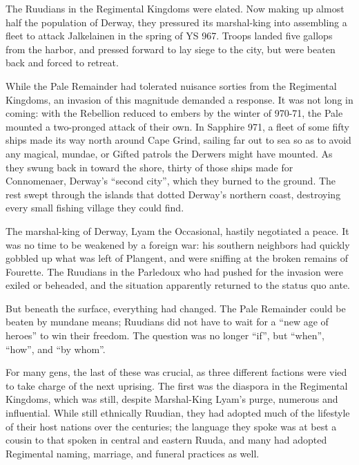 \documentclass[12pt]{report}
\begin{document}
The Ruudians in the Regimental Kingdoms were elated.  Now making up
almost half the population of Derway, they pressured its marshal-king
into assembling a fleet to attack Jalkelainen in the spring of YS 967.
Troops landed five gallops from the harbor, and pressed forward to lay
siege to the city, but were beaten back and forced to retreat.

While the Pale Remainder had tolerated nuisance sorties from the
Regimental Kingdoms, an invasion of this magnitude demanded a
response.  It was not long in coming: with the Rebellion reduced to
embers by the winter of 970-71, the Pale mounted a two-pronged attack
of their own.  In Sapphire 971, a fleet of some fifty ships made its
way north around Cape Grind, sailing far out to sea so as to avoid any
magical, mundae, or Gifted patrols the Derwers might have mounted.  As
they swung back in toward the shore, thirty of those ships made for
Connomenaer, Derway's ``second city'', which they burned to the ground.
The rest swept through the islands that dotted Derway's northern
coast, destroying every small fishing village they could find.

The marshal-king of Derway, Lyam the Occasional, hastily negotiated a
peace.  It was no time to be weakened by a foreign war: his southern
neighbors had quickly gobbled up what was left of Plangent, and were
sniffing at the broken remains of Fourette.  The Ruudians in the
Parledoux who had pushed for the invasion were exiled or beheaded, and
the situation apparently returned to the status quo ante.

But beneath the surface, everything had changed.  The Pale Remainder
could be beaten by mundane means; Ruudians did not have to wait for a
``new age of heroes'' to win their freedom.  The question was no longer
``if'', but ``when'', ``how'', and ``by whom''.

For many gens, the last of these was crucial, as three different
factions were vied to take charge of the next uprising.  The first was
the diaspora in the Regimental Kingdoms, which was still, despite
Marshal-King Lyam's purge, numerous and influential.  While still
ethnically Ruudian, they had adopted much of the lifestyle of their
host nations over the centuries; the language they spoke was at best a
cousin to that spoken in central and eastern Ruuda, and many had
adopted Regimental naming, marriage, and funeral practices as well.
\end{document}
